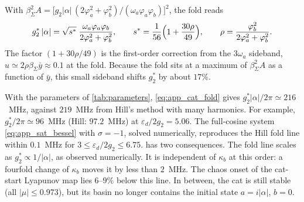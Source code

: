 With $\beta_\Sigma^2A=\bigl[g_2|\alpha|\,(2\varphi_a^2+\varphi_b^2)/(\omega_a\varphi_a\varphi_b)\bigr]^2$, the fold reads
\begin{equation}
    g_2^\ast\,|\alpha| = \sqrt{s^\ast}\;\frac{\omega_a\varphi_a\varphi_b}{2\varphi_a^2+\varphi_b^2},
    \qquad
    s^\ast = \frac{1}{56}\Bigl(1+\frac{30\rho}{49}\Bigr),
    \qquad
    \rho = \frac{\varphi_b^2}{2\varphi_a^2+\varphi_b^2}.
\label{eq:app_cat_fold}
\end{equation}
The factor $(1+30\rho/49)$ is the first-order correction from the $3\omega_a$ sideband, $u\simeq 2\rho\beta_\Sigma\bar y\approx0.1$ at the fold.
Because the fold sits at a maximum of $\beta_\Sigma^2A$ as a function of $\bar y$, this small sideband shifts $g_2^\ast$ by about $17\%$.

With the parameters of \cref{tab:parameters}, \cref{eq:app_cat_fold} gives $g_2^\ast|\alpha|/2\pi \simeq 216$~MHz, against $219$~MHz from Hill's method with many harmonics. For example, $g_2^\ast/2\pi\simeq96$~MHz (Hill: $97.2$~MHz) at $\varepsilon_d/2g_2=5.06$.
The full-cosine system \cref{eq:app_sat_bessel} with $\sigma=-1$, solved numerically, reproduces the Hill fold line within $0.1$~MHz for $3\le\varepsilon_d/2g_2\le6.75$.
 has two consequences. The fold line scales as $g_2^\ast\propto1/|\alpha|$, as observed numerically. It is independent of $\kappa_b$ at this order: a fourfold change of $\kappa_b$ moves it by less than $2$~MHz.
The chaos onset of the cat-start Lyapunov map lies $6$--$9\%$ below this line. In between, the cat is still stable (all $|\mu|\le0.973$), but its basin no longer contains the initial state $a=i|\alpha|$, $b=0$.
